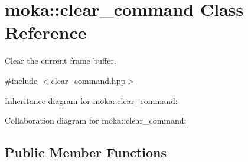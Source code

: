 \hypertarget{classmoka_1_1clear__command}{}\section{moka\+::clear\+\_\+command Class Reference}
\label{classmoka_1_1clear__command}


Clear the current frame buffer.  




{\ttfamily \#include $<$clear\+\_\+command.\+hpp$>$}



Inheritance diagram for moka\+::clear\+\_\+command\+:


Collaboration diagram for moka\+::clear\+\_\+command\+:
\subsection*{Public Member Functions}
